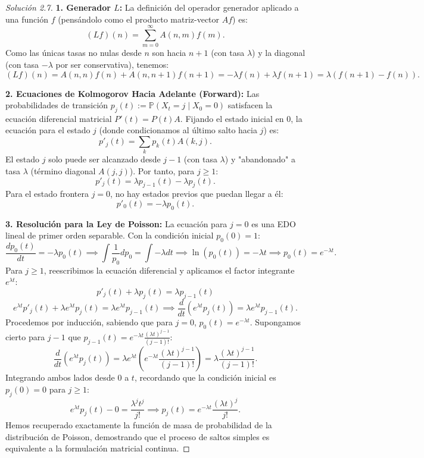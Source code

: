 \documentclass[10pt,a4paper]{article}
\begin{document}
\begin{proof}[Solución 2.7]
    \textbf{1. Generador $L$:}
    La definición del operador generador aplicado a una función $f$ (pensándolo como el producto matriz-vector $Af$) es:
    \[ (Lf)(n) = \sum_{m=0}^\infty A(n,m)f(m). \]
    Como las únicas tasas no nulas desde $n$ son hacia $n+1$ (con tasa $\lambda$) y la diagonal (con tasa $-\lambda$ por ser conservativa), tenemos:
    \[ (Lf)(n) = A(n,n)f(n) + A(n,n+1)f(n+1) = -\lambda f(n) + \lambda f(n+1) = \lambda(f(n+1) - f(n)). \]

    \textbf{2. Ecuaciones de Kolmogorov Hacia Adelante (Forward):}
    Las probabilidades de transición $p_j(t) := \mathbb{P}(X_t=j \mid X_0=0)$ satisfacen la ecuación diferencial matricial $P'(t) = P(t)A$. 
    Fijando el estado inicial en $0$, la ecuación para el estado $j$ (donde condicionamos al último salto hacia $j$) es:
    \[ p'_j(t) = \sum_{k} p_k(t)A(k,j). \]
    El estado $j$ solo puede ser alcanzado desde $j-1$ (con tasa $\lambda$) y "abandonado" a tasa $\lambda$ (término diagonal $A(j,j)$).
    Por tanto, para $j \ge 1$:
    \[ p'_j(t) = \lambda p_{j-1}(t) - \lambda p_j(t). \]
    Para el estado frontera $j=0$, no hay estados previos que puedan llegar a él:
    \[ p'_0(t) = -\lambda p_0(t). \]

    \textbf{3. Resolución para la Ley de Poisson:}
    La ecuación para $j=0$ es una EDO lineal de primer orden separable. Con la condición inicial $p_0(0) = 1$:
    \[ \frac{dp_0(t)}{dt} = -\lambda p_0(t) \implies \int \frac{1}{p_0} dp_0 = \int -\lambda dt \implies \ln(p_0(t)) = -\lambda t \implies p_0(t) = e^{-\lambda t}. \]
    Para $j \ge 1$, reescribimos la ecuación diferencial y aplicamos el factor integrante $e^{\lambda t}$:
    \[ p'_j(t) + \lambda p_j(t) = \lambda p_{j-1}(t) \]
    \[ e^{\lambda t} p'_j(t) + \lambda e^{\lambda t} p_j(t) = \lambda e^{\lambda t} p_{j-1}(t) \implies \frac{d}{dt} \left( e^{\lambda t} p_j(t) \right) = \lambda e^{\lambda t} p_{j-1}(t). \]
    Procedemos por inducción, sabiendo que para $j=0$, $p_0(t) = e^{-\lambda t}$. Supongamos cierto para $j-1$ que $p_{j-1}(t) = e^{-\lambda t} \frac{(\lambda t)^{j-1}}{(j-1)!}$:
    \[ \frac{d}{dt} \left( e^{\lambda t} p_j(t) \right) = \lambda e^{\lambda t} \left( e^{-\lambda t} \frac{(\lambda t)^{j-1}}{(j-1)!} \right) = \lambda \frac{(\lambda t)^{j-1}}{(j-1)!}. \]
    Integrando ambos lados desde $0$ a $t$, recordando que la condición inicial es $p_j(0) = 0$ para $j \ge 1$:
    \[ e^{\lambda t} p_j(t) - 0 = \frac{\lambda^j t^j}{j!} \implies p_j(t) = e^{-\lambda t} \frac{(\lambda t)^j}{j!}. \]
    Hemos recuperado exactamente la función de masa de probabilidad de la distribución de Poisson, demostrando que el proceso de saltos simples es equivalente a la formulación matricial continua.
\end{proof}
\end{document}

